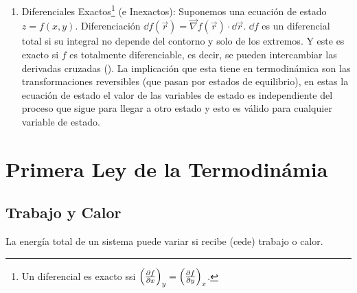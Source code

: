 \begin{enumerate}
	\item Diferenciales Exactos\footnote{Un diferencial es exacto ssi $\qty(\pdv{f}{x})_y = \qty(\pdv{f}{y})_x$.} (e Inexactos): Suponemos una ecuación de estado $z = f(x,y)$. Diferenciación $\dd{f(\vec{r})} = \vec{\nabla} f(\vec{r}) \cdot \dd{\vec{r}}$. $\dd{f}$ es un diferencial total si su integral no depende del contorno y solo de los extremos. Y este es exacto si $f$ es totalmente diferenciable, es decir, se pueden intercambiar las derivadas cruzadas (). La implicación que esta tiene en termodinámica son las transformaciones reversibles (que pasan por estados de equilibrio), en estas la ecuación de estado el valor de las variables de estado es independiente del proceso que sigue para llegar a otro estado y esto es válido para cualquier variable de estado.
\end{enumerate}



\chapter{Primera Ley de la Termodinámia}


\section{Trabajo y Calor}
La energía total de un sistema puede variar si recibe (cede) trabajo o calor.

